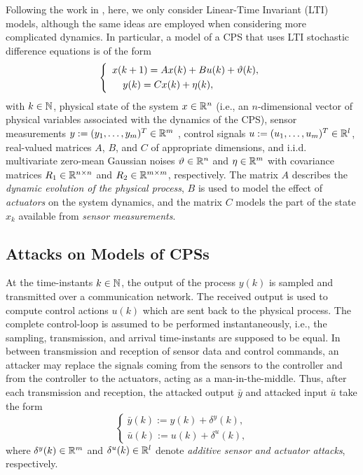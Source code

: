 {Following the work in \cite{CPSAttacksAgainstPCS,LimitingImpactStealthyAttacks,CPSDetectingIntegrityAttacksScada,CPSIntegrityAttacks,Carlos_Justin1,Carlos_Justin2,Carlos_Justin3}, here, we only consider Linear-Time Invariant (LTI) models, although the same ideas are employed when considering more complicated dynamics. In particular, a model of a CPS that uses LTI stochastic difference equations is of the form
\begin{equation}
\left\{
\begin{array}{ll}
{x}({k+1}) = Ax(k) + B u(k) + \vartheta(k),  \label{1} \\[1mm]
\hspace{3.8mm} y(k) = Cx(k) + \eta(k),
\end{array}
\right.
\end{equation}
with $k\in \mathbb{N}$, physical state of the system $x \in \mathbb{R}^n$ (i.e., an $n$-dimensional vector of physical variables associated with the dynamics of the CPS), sensor measurements $y := (y_1,\ldots,y_m)^T \in \mathbb{R}^m$ , control signals $u := (u_1,\ldots,u_m)^T \in \mathbb{R}^l$, real-valued matrices $A$, $B$, and $C$ of appropriate dimensions, and i.i.d. multivariate zero-mean Gaussian noises $\vartheta \in \mathbb{R}^n$ and $\eta \in \mathbb{R}^m$ with covariance matrices $R_{1} \in \mathbb{R}^{n \times n}$ and $R_2 \in \mathbb{R}^{m \times m}$, respectively. The matrix $A$ describes the \emph{dynamic evolution of the physical process}, $B$ is used to model the effect of \emph{actuators} on the system dynamics, and the matrix $C$ models the part of the state $x_k$ available from \emph{sensor measurements}.

\subsection{Attacks on Models of CPSs}
\label{sec:AttacksOnModels} 
At the time-instants $k \in \mathbb{N}$, the output of the process $y(k)$ is sampled and transmitted over a communication network. The received output is used to compute control actions $u(k)$ which are sent back to the physical process. The complete control-loop is assumed to be performed instantaneously, i.e., the sampling, transmission, and arrival time-instants are supposed to be equal.
In between transmission and reception of sensor data and control commands, an attacker may replace the signals coming from the sensors to the controller and from the controller to the actuators, acting as a {man-in-the-middle}. Thus, after each transmission and reception, the attacked output $\bar{y}$ and attacked input $\bar{u}$ take the form
\begin{equation}
\left\{
\begin{array}{ll}
\bar{y}(k) := y(k) + \delta^y(k) 
, \label{3}\\[1mm]
\bar{u}(k) := u(k) + \delta^u(k),
\end{array}\right.
\end{equation}
where $\delta^y(k) \in \mathbb{R}^m$ and $\delta^u(k) \in \mathbb{R}^l$ denote \emph{additive sensor and actuator attacks}, respectively.

}

